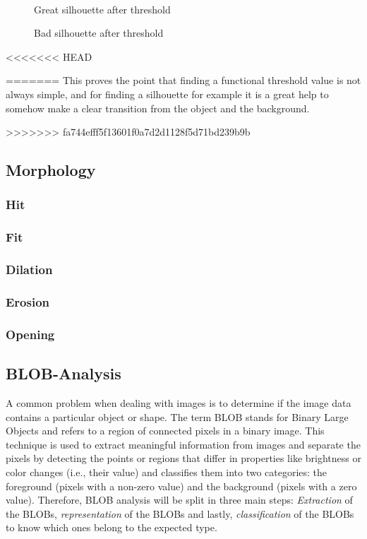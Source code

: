\begin{figure}[htbp]
\begin{minipage}[b]{0.45\textwidth}
\end{minipage} \\ %
\begin{minipage}[t]{0.45\textwidth}
\caption{Great silhouette after threshold} %
\label{fig:SimpleThresholdAfter}
\end{minipage} \hfill
\begin{minipage}[t]{0.45\textwidth}
\caption{Bad silhouette after threshold} %
\label{fig:ComplicatedThresholdAfter}
\end{minipage}
\end{figure}
 
<<<<<<< HEAD
 
 
=======
This proves the point that finding a functional threshold value is not always simple, and for finding a silhouette for example it is a great help to somehow make a clear transition from the object and the background.

>>>>>>> fa744efff5f13601f0a7d2d1128f5d71bd239b9b
\subsection{Morphology}
\subsubsection{Hit}
\subsubsection{Fit}
\subsubsection{Dilation}
\subsubsection{Erosion}
\subsubsection{Opening}
\subsection{BLOB-Analysis}
A common problem when dealing with images is to determine if the image data contains a particular object or shape. The term BLOB stands for Binary Large Objects and refers to a region of connected pixels in a binary image. This technique is used to extract meaningful information from images and separate the pixels by detecting the points or regions that differ in properties like brightness or color changes (i.e., their value) and classifies them into two categories: the foreground (pixels with a non-zero value) and the background (pixels with a zero value).
Therefore, BLOB analysis will be split in three main steps: \textit{Extraction} of the BLOBs, \textit{representation} of the BLOBs and lastly, \textit{classification} of the BLOBs to know which ones belong to the expected type.
